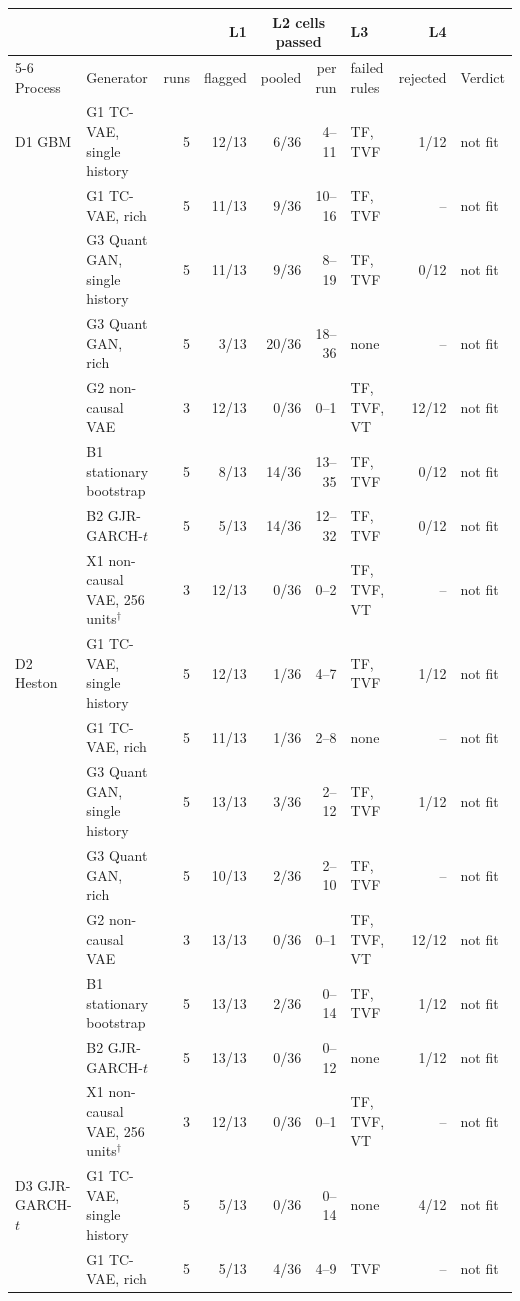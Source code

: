 \begin{tabular}{llrrrrlrl}
\toprule
& & & L1 & \multicolumn{2}{c}{L2 cells passed} & L3 & L4 & \\
\cmidrule(lr){5-6}
Process & Generator & runs & flagged & pooled & per run & failed rules & rejected & Verdict \\
\midrule
D1 GBM & G1 TC-VAE, single history & 5 & 12/13 & 6/36 & 4--11 & TF, TVF & 1/12 & not fit \\
 & G1 TC-VAE, rich & 5 & 11/13 & 9/36 & 10--16 & TF, TVF & -- & not fit \\
 & G3 Quant GAN, single history & 5 & 11/13 & 9/36 & 8--19 & TF, TVF & 0/12 & not fit \\
 & G3 Quant GAN, rich & 5 & 3/13 & 20/36 & 18--36 & none & -- & not fit \\
 & G2 non-causal VAE & 3 & 12/13 & 0/36 & 0--1 & TF, TVF, VT & 12/12 & not fit \\
 & B1 stationary bootstrap & 5 & 8/13 & 14/36 & 13--35 & TF, TVF & 0/12 & not fit \\
 & B2 GJR-GARCH-$t$ & 5 & 5/13 & 14/36 & 12--32 & TF, TVF & 0/12 & not fit \\
 & X1 non-causal VAE, 256 units$^{\dagger}$ & 3 & 12/13 & 0/36 & 0--2 & TF, TVF, VT & -- & not fit \\
\addlinespace
D2 Heston & G1 TC-VAE, single history & 5 & 12/13 & 1/36 & 4--7 & TF, TVF & 1/12 & not fit \\
 & G1 TC-VAE, rich & 5 & 11/13 & 1/36 & 2--8 & none & -- & not fit \\
 & G3 Quant GAN, single history & 5 & 13/13 & 3/36 & 2--12 & TF, TVF & 1/12 & not fit \\
 & G3 Quant GAN, rich & 5 & 10/13 & 2/36 & 2--10 & TF, TVF & -- & not fit \\
 & G2 non-causal VAE & 3 & 13/13 & 0/36 & 0--1 & TF, TVF, VT & 12/12 & not fit \\
 & B1 stationary bootstrap & 5 & 13/13 & 2/36 & 0--14 & TF, TVF & 1/12 & not fit \\
 & B2 GJR-GARCH-$t$ & 5 & 13/13 & 0/36 & 0--12 & none & 1/12 & not fit \\
 & X1 non-causal VAE, 256 units$^{\dagger}$ & 3 & 12/13 & 0/36 & 0--1 & TF, TVF, VT & -- & not fit \\
\addlinespace
D3 GJR-GARCH-$t$ & G1 TC-VAE, single history & 5 & 5/13 & 0/36 & 0--14 & none & 4/12 & not fit \\
 & G1 TC-VAE, rich & 5 & 5/13 & 4/36 & 4--9 & TVF & -- & not fit \\

\end{tabular}
